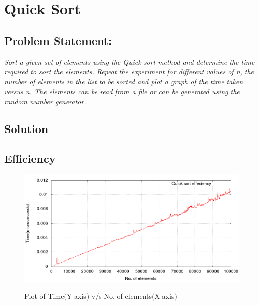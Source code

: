 \documentclass[12pt, a4paper]{article}
\begin{document}
\section{Quick Sort}\subsection*{Problem Statement:}\par\textit{Sort a given set of elements using the Quick sort method and determine the time
required to sort the elements. Repeat the experiment for different values of n, the
number of elements in the list to be sorted and plot a graph of the time taken
versus n. The elements can be read from a file or can be generated using the
random number generator.}
\subsection*{Solution}

\subsection*{Efficiency}
\begin{figure}[h]
\centering
\includegraphics[width=5 in]{./Performance_graphs/quick.png}
\label{Figure 1}
\caption{Plot of Time(Y-axis) v/s No. of elements(X-axis)}
\end{figure}
\newpage
\end{document}
